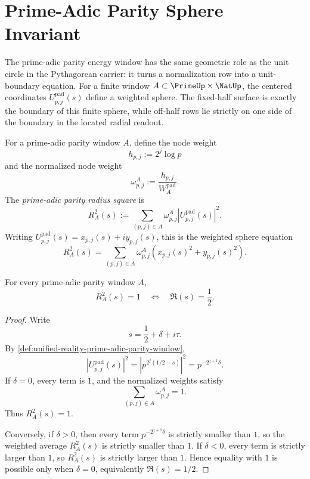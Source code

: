 \section{Prime-Adic Parity Sphere Invariant}
\label{sec:unified-reality-prime-adic-parity-sphere-invariant}

The prime-adic parity energy window has the same geometric role as the
unit circle in the Pythagorean carrier: it turns a normalization row into
a unit-boundary equation.  For a finite window
$A\subset\PrimeUp\times\NatUp$, the centered coordinates
$U_{p,j}^{\mathrm{pad}}(s)$ define a weighted sphere.  The fixed-half
surface is exactly the boundary of this finite sphere, while off-half
rows lie strictly on one side of the boundary in the located radial
readout.

\begin{definition}
\label{def:unified-reality-prime-adic-parity-radius}
For a prime-adic parity window $A$, define the node weight
$$
h_{p,j}:=2^j\log p
$$
and the normalized node weight
$$
\omega_{p,j}^{A}:=\frac{h_{p,j}}{W_A^{\mathrm{pad}}}.
$$
The \emph{prime-adic parity radius square} is
$$
R_A^2(s)
:=
\sum_{(p,j)\in A}
\omega_{p,j}^{A}
\left|U_{p,j}^{\mathrm{pad}}(s)\right|^2.
$$
Writing $U_{p,j}^{\mathrm{pad}}(s)=x_{p,j}(s)+iy_{p,j}(s)$, this is the
weighted sphere equation
$$
R_A^2(s)
=
\sum_{(p,j)\in A}
\omega_{p,j}^{A}
\left(x_{p,j}(s)^2+y_{p,j}(s)^2\right).
$$
\end{definition}

\begin{theorem}
\label{thm:unified-reality-prime-adic-parity-sphere-fixed-half}
For every prime-adic parity window $A$,
$$
R_A^2(s)=1
\quad\Longleftrightarrow\quad
\Re(s)=\frac12.
$$
\end{theorem}

\begin{proof}
Write
$$
s=\frac12+\delta+i\tau.
$$
By
\autoref{def:unified-reality-prime-adic-parity-window},
$$
\left|U_{p,j}^{\mathrm{pad}}(s)\right|^2
=
\left|p^{2^j(1/2-s)}\right|^2
=
p^{-2^{j+1}\delta}.
$$
If $\delta=0$, every term is $1$, and the normalized weights satisfy
$$
\sum_{(p,j)\in A}\omega_{p,j}^{A}=1.
$$
Thus $R_A^2(s)=1$.

Conversely, if $\delta>0$, then every term $p^{-2^{j+1}\delta}$ is
strictly smaller than $1$, so the weighted average $R_A^2(s)$ is
strictly smaller than $1$.  If $\delta<0$, every term is strictly larger
than $1$, so $R_A^2(s)$ is strictly larger than $1$.  Hence equality
with $1$ is possible only when $\delta=0$, equivalently
$\Re(s)=1/2$.
\end{proof}

